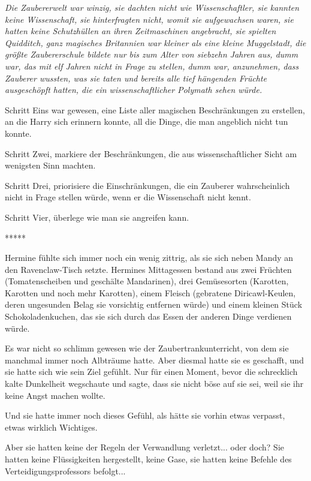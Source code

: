 \emph{Die Zaubererwelt war winzig, sie dachten nicht wie Wissenschaftler, sie
kannten keine Wissenschaft, sie hinterfragten nicht, womit sie aufgewachsen
waren, sie hatten keine Schutzhüllen an ihren Zeitmaschinen angebracht, sie
spielten Quidditch, ganz magisches Britannien war kleiner als eine kleine
Muggelstadt, die größte Zaubererschule bildete nur bis zum Alter von siebzehn
Jahren aus, dumm war, das mit elf Jahren nicht in Frage zu stellen, dumm war,
anzunehmen, dass Zauberer wussten, was sie taten und bereits alle tief hängenden
Früchte ausgeschöpft hatten, die ein wissenschaftlicher Polymath sehen würde.}

Schritt Eins war gewesen, eine Liste aller magischen Beschränkungen zu
erstellen, an die Harry sich erinnern konnte, all die Dinge, die man angeblich
nicht tun konnte.

Schritt Zwei, markiere der Beschränkungen, die aus wissenschaftlicher Sicht am
wenigsten Sinn machten.

Schritt Drei, priorisiere die Einschränkungen, die ein Zauberer wahrscheinlich
nicht in Frage stellen würde, wenn er die Wissenschaft nicht kennt.

Schritt Vier, überlege wie man sie angreifen kann.

\begin{center}*****\end{center}

Hermine fühlte sich immer noch ein wenig zittrig, als sie sich neben Mandy an
den Ravenclaw-Tisch setzte. Hermines Mittagessen bestand aus zwei Früchten
(Tomatenscheiben und geschälte Mandarinen), drei Gemüsesorten (Karotten,
Karotten und noch mehr Karotten), einem Fleisch (gebratene Diricawl-Keulen,
deren ungesunden Belag sie vorsichtig entfernen würde) und einem kleinen Stück
Schokoladenkuchen, das sie sich durch das Essen der anderen Dinge verdienen
würde.

Es war nicht so schlimm gewesen wie der Zaubertrankunterricht, von dem sie
manchmal immer noch Albträume hatte. Aber diesmal hatte sie es geschafft, und
sie hatte sich wie sein Ziel gefühlt. Nur für einen Moment, bevor die
schrecklich kalte Dunkelheit wegschaute und sagte, dass sie nicht böse auf sie
sei, weil sie ihr keine Angst machen wollte.

Und sie hatte immer noch dieses Gefühl, als hätte sie vorhin etwas verpasst,
etwas wirklich Wichtiges.

Aber sie hatten keine der Regeln der Verwandlung verletzt... oder doch? Sie
hatten keine Flüssigkeiten hergestellt, keine Gase, sie hatten keine Befehle des
Verteidigungsprofessors befolgt...

